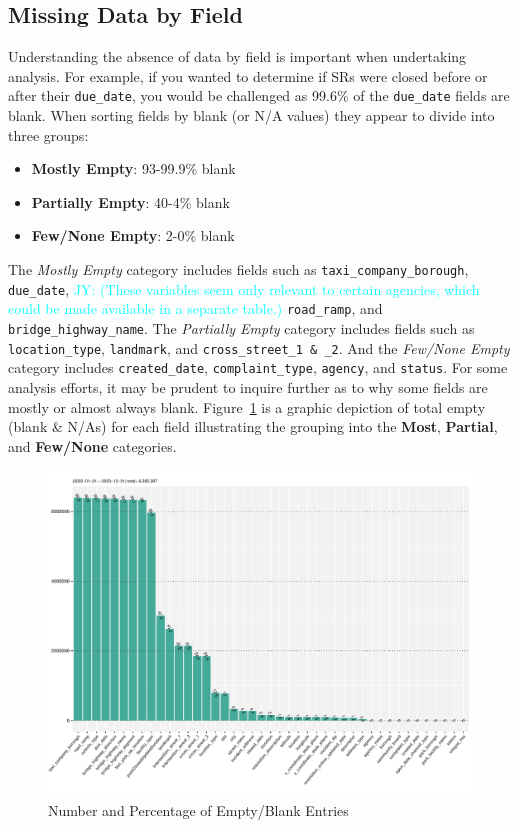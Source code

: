 \documentclass[linenumber]{jdsart}
\newcommand{\jy}[1]{\textcolor{cyan}{JY: (#1)}}
\begin{document}
\subsection{Missing Data by Field}
\label{sec:blanks}
Understanding the absence of data by field is important 
when undertaking analysis. For example, if you wanted to 
determine if SRs were closed before or after their
\texttt{due\_date}, you would be challenged as 99.6\% of the
\texttt{due\_date} fields are blank. When sorting fields by
blank (or N/A values) they appear to divide into three groups:

\begin{itemize}[left=1.5em]
    \item \textbf{Mostly Empty}: 93-99.9\% blank 
    \item \textbf{Partially Empty}: 40-4\% blank
    \item \textbf{Few/None Empty}: 2-0\% blank
\end{itemize}

The \textit{Mostly Empty} category includes fields such as
\texttt{taxi\_company\_borough}, \texttt{due\_date},
\jy{These variables seem only relevant to certain agencies, which
  could be made available in a separate table.}
\texttt{road\_ramp}, and \texttt{bridge\_highway\_name}.
The \textit{Partially Empty} category includes fields such as
\texttt{location\_type}, \texttt{landmark}, 
and \texttt{cross\_street\_1 \& \_2}. And the \textit{Few/None Empty} 
category includes \texttt{created\_date}, \texttt{complaint\_type},
\texttt{agency}, and \texttt{status}. For some analysis efforts, it may be
prudent to inquire further as to why some fields are 
mostly or almost always blank. Figure~\ref{fig:blank_fields} is 
a graphic depiction of total empty (blank \& N/As) for each 
field illustrating the grouping into 
the \textbf{Most}, \textbf{Partial}, and \textbf{Few/None} categories.

\begin{figure}[tbp]
	\centering
  	\includegraphics[width=\textwidth]{BlankFields.pdf}
	\caption{Number and Percentage of Empty/Blank Entries}
	\label{fig:blank_fields}
\end{figure}
\end{document}
